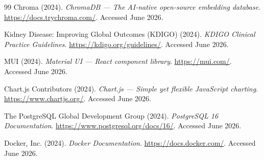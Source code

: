 \documentclass[12pt,a4paper,twoside]{report}
\begin{document}
\begin{thebibliography}{99}
Chroma (2024).
\newblock \textit{ChromaDB --- The AI-native open-source embedding database}.
\newblock \url{https://docs.trychroma.com/}. Accessed June 2026.

Kidney Disease: Improving Global Outcomes (KDIGO) (2024).
\newblock \textit{KDIGO Clinical Practice Guidelines}.
\newblock \url{https://kdigo.org/guidelines/}. Accessed June 2026.

MUI (2024).
\newblock \textit{Material UI --- React component library}.
\newblock \url{https://mui.com/}. Accessed June 2026.

Chart.js Contributors (2024).
\newblock \textit{Chart.js --- Simple yet flexible JavaScript charting}.
\newblock \url{https://www.chartjs.org/}. Accessed June 2026.

The PostgreSQL Global Development Group (2024).
\newblock \textit{PostgreSQL 16 Documentation}.
\newblock \url{https://www.postgresql.org/docs/16/}. Accessed June 2026.

Docker, Inc. (2024).
\newblock \textit{Docker Documentation}.
\newblock \url{https://docs.docker.com/}. Accessed June 2026.

\end{thebibliography}
\end{document}

